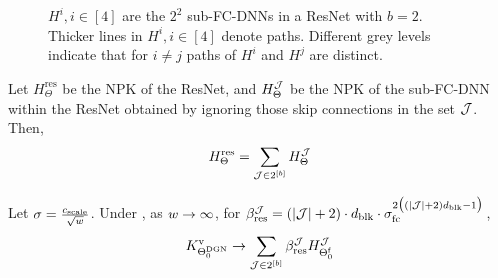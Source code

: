 \begin{figure}[h]
\caption{\small{$H^i,i\in[4]$ are the $2^2$ sub-FC-DNNs in a ResNet with $b=2$. Thicker lines in $H^i,i\in[4]$ denote paths. Different grey levels indicate that for $i\neq j$ paths of $H^i$ and $H^j$ are distinct.}}
\label{fig:subfcdnn}
\end{figure}

\begin{lemma}\label{lm:sumofproduct}
Let $H^{\text{res}}_{\Theta}$ be the NPK of the ResNet, and $H^{\mathcal{J}}_{\Theta}$ be the NPK of the sub-FC-DNN within the ResNet obtained by ignoring those skip connections in the set $\mathcal{J}$. Then, \begin{align*}H^{\text{res}}_{\Theta}=\sum_{\mathcal{J}\in 2^{[b]}}H^{\mathcal{J}}_{\Theta}\end{align*}
\end{lemma}

\begin{theorem}\label{th:mainres} Let $\sigma=\frac{c_{\text{scale}}}{\sqrt{w}}$. Under , as $w\rightarrow\infty$,  for $\beta_{\text{res}}^{\mathcal{J}} = (|\mathcal{J}| +2)\cdot d_{\text{blk}}\cdot \sigma_{\text{fc}}^{2\big( (|\mathcal{J}|+2)d_{\text{blk}}-1\big)}$,
\begin{align*}
K^{\text{v}}_{\Theta^{\text{DGN}}_0}\rightarrow \sum_{\mathcal{J}\in 2^{[b]}}  \beta_{\text{res}}^{\mathcal{J}} H^{\mathcal{J}}_{\Theta^{\textrm{f}}_0}
\end{align*}
\end{theorem}